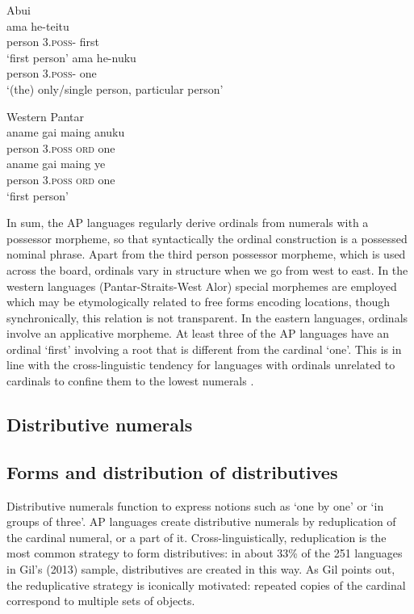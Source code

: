 \ea%
\label{bkm:Ref342651068}
Abui\\
\ea
\gll ama     he-teitu\\
    person    3\textsc{.poss-}  first  \\
\glt`first person'
\ex
\gll ama     he-nuku\\
  person    3\textsc{.poss- } one  \\
\glt `(the) only/single person,  particular person'
\z\z




\ea%
\label{bkm:Ref342651067}
Western Pantar\\
\ea
\gll aname    gai  maing   anuku\\
     person    3\textsc{.poss   ord } one\\
\ex
\gll aname    gai  maing   ye\\
    person    3\textsc{.poss   ord } one\\
\glt `first person'
\z\z




In sum, the AP languages regularly derive ordinals from numerals with a possessor morpheme, so that syntactically the ordinal construction is a possessed nominal phrase. Apart from the third person possessor morpheme, which is used across the board, ordinals vary in structure when we go from west to east. In the western languages (Pantar-Straits-West Alor) special morphemes are employed which may be etymologically related to free forms encoding locations, though synchronically, this relation is not transparent. In the eastern languages, ordinals involve an applicative morpheme. At least three of the AP languages have an ordinal `first' involving a root that is different from the cardinal `one'. This is in line with the cross-linguistic tendency for languages with ordinals unrelated to cardinals to confine them to the lowest numerals \citep{StolzEtAl2013}.

\subsection{{Distributive numerals}}
\subsection{{Forms and distribution of distributives} }
Distributive numerals function to express notions such as `one by one' or `in groups of three'. AP languages create distributive numerals by reduplication of the cardinal numeral, or a part of it. Cross-linguistically, reduplication is the most common strategy to form distributives: in about 33\% of the 251 languages in Gil's (2013) \nocite{Gil2013} sample, distributives are created in this way. As Gil points out, the reduplicative strategy is iconically motivated: repeated copies of the cardinal correspond to multiple sets of objects.

